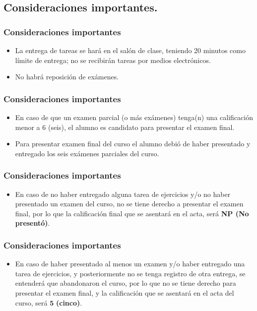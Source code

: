 \subsection{Consideraciones importantes.}
\begin{frame}
\frametitle{Consideraciones importantes}
\begin{itemize}
\setlength{\itemsep}{0mm}
\item La entrega de tareas se hará en el salón de clase, teniendo 20 minutos como límite de entrega; no se recibirán tareas por medios electrónicos.
\item No habrá reposición de exámenes.
\end{itemize}
\end{frame}
\begin{frame}
\frametitle{Consideraciones importantes}
\begin{itemize}
\setlength{\itemsep}{0mm}
\item En caso de que un examen parcial (o más exámenes) tenga(n) una calificación menor a $6$ (seis), el alumno es candidato para presentar el examen final.
\item Para presentar examen final del curso el alumno debió de haber presentado y entregado los seis exámenes parciales del curso.
\end{itemize}
\end{frame}
\begin{frame}
\frametitle{Consideraciones importantes}
\begin{itemize}
\setlength{\itemsep}{0mm}
\item En caso de no haber entregado alguna tarea de ejercicios y/o no haber presentado un examen del curso, no se tiene derecho a presentar el examen final, por lo que la calificación final que se asentará en el acta, será \textbf{NP (No presentó)}.
\end{itemize}
\end{frame}
\begin{frame}
\frametitle{Consideraciones importantes}
\begin{itemize}
\setlength{\itemsep}{0mm}
\item En caso de haber presentado al menos un examen y/o haber entregado una tarea de ejercicios, y posteriormente no se tenga registro de otra entrega, se entenderá que abandonaron el curso, por lo que no se tiene derecho para presentar el examen final, y la calificación que se asentará en el acta del curso, será $\mathbf{5}$ \textbf{(cinco)}.
\end{itemize}
\end{frame}
